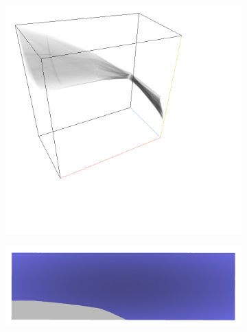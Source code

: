 \documentclass[a4paper,fontsize=12pt,toc=bib,halfparskip]{scrartcl}
\begin{document}
\begin{figure}
\begin{subfigure}{0.4\textwidth}
		\includegraphics[width=\textwidth]{pictures/results/Beam/Beam_InvariantSpace2.png}
		\subcaption{}
		\label{BeamInvariant2}
	\end{subfigure}
	\hspace*{\fill}
	\begin{subfigure}{0.4\textwidth}
		\centering
		\includegraphics[width=\textwidth]{pictures/results/Beam/Beam_Object2.png}
		\subcaption{}
		\label{BeamObject2}
	\end{subfigure}
	\medskip
	\begin{subfigure}{0.4\textwidth}
		\centering

\end{subfigure}
\end{figure}
\end{document}
